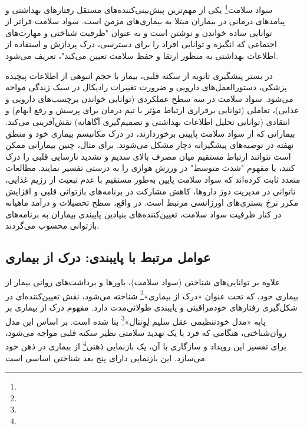 سواد سلامت\footnote{} یکی از مهم‌ترین پیش‌بینی‌کننده‌های مستقل رفتارهای بهداشتی و پیامدهای درمانی در بیماران مبتلا به بیماری‌های مزمن است. سواد سلامت فراتر از توانایی ساده خواندن و نوشتن است و به عنوان "ظرفیت شناختی و مهارت‌های اجتماعی که انگیزه و توانایی افراد را برای دسترسی، درک پردازش و استفاده از اطلاعات بهداشتی به منظور ارتقا و حفظ سلامت تعیین می‌کند"، تعریف می‌شود\cite{Sorensen2015HealthLiteracy}.

در بستر پیشگیری ثانویه از سکته قلبی، بیمار با حجم انبوهی از اطلاعات پیچیده پزشکی، دستورالعمل‌های دارویی و ضرورت تغییرات رادیکال در سبک زندگی مواجه می‌شود. سواد سلامت در سه سطح عملکردی (توانایی خواندن برچسب‌های دارویی و غذایی)، تعاملی (توانایی برقراری ارتباط مؤثر با تیم درمان برای پرسش و رفع ابهام) و انتقادی (توانایی تحلیل اطلاعات بهداشتی و تصمیم‌گیری آگاهانه) نقش‌آفرینی می‌کند\cite{Sorensen2015HealthLiteracy,Zakeri2023HealthLiteracy}. بیمارانی که از سواد سلامت پایینی برخوردارند، در درک مکانیسم بیماری خود و منطق نهفته در توصیه‌های پیشگیرانه دچار مشکل می‌شوند. برای مثال، چنین بیمارانی ممکن است نتوانند ارتباط مستقیم میان مصرف بالای سدیم و تشدید نارسایی قلبی را درک کنند، یا مفهوم "شدت متوسط" در ورزش هوازی را به درستی تفسیر نمایند. مطالعات متعدد ثابت کرده‌اند که سواد سلامت پایین به‌طور مستقیم با عدم تبعیت از رژیم غذایی، ناتوانی در مدیریت دوز داروها، کاهش مشارکت در برنامه‌های بازتوانی قلبی و افزایش مکرر نرخ بستری‌های اورژانسی مرتبط است\cite{He2026CardiacRehab,Zakeri2023HealthLiteracy}. در واقع، سطح تحصیلات و درآمد ماهیانه در کنار ظرفیت سواد سلامت، تعیین‌کننده‌های بنیادین پایبندی بیماران به برنامه‌های بازتوانی محسوب می‌گردند\cite{He2026CardiacRehab}.

\subsection{عوامل مرتبط با پایبندی: درک از بیماری}

علاوه بر توانایی‌های شناختی (سواد سلامت)، باورها و برداشت‌های روانی بیمار از بیماری خود، که تحت عنوان «درک از بیماری»\footnote{} شناخته می‌شود، نقش تعیین‌کننده‌ای در شکل‌گیری رفتارهای خودمراقبتی و پایبندی طولانی‌مدت دارد. مفهوم درک از بیماری بر پایه «مدل خودتنظیمی عقل سلیم لِوِنتال»\footnote{} بنا شده است\cite{Leventhal2016CSM}. بر اساس این مدل روان‌شناختی، هنگامی که فرد با یک تهدید سلامتی نظیر سکته قلبی مواجه می‌شود، برای تفسیر این رویداد و سازگاری با آن، یک بازنمایی ذهنی\footnote{} از بیماری در ذهن خود می‌سازد\cite{Leventhal2016CSM,Broadbent2015BriefIPQ}. این بازنمایی دارای پنج بعد شناختی اساسی است:

